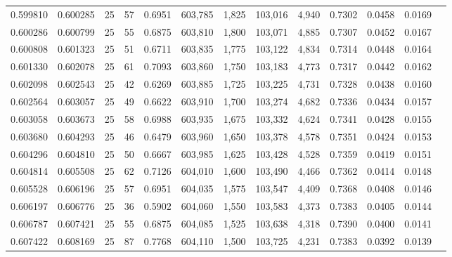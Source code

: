 \begin{tabular}{rrrrrrrrrrrrr}
0.599810 & 0.600285 &    25 &  57 &                                     0.6951 & 603,785 &   1,825 & 103,016 &   4,940 & 0.7302 & 0.0458 & 0.0169 \\
0.600286 & 0.600799 &    25 &  55 &                                     0.6875 & 603,810 &   1,800 & 103,071 &   4,885 & 0.7307 & 0.0452 & 0.0167 \\
0.600808 & 0.601323 &    25 &  51 &                                     0.6711 & 603,835 &   1,775 & 103,122 &   4,834 & 0.7314 & 0.0448 & 0.0164 \\
0.601330 & 0.602078 &    25 &  61 &                                     0.7093 & 603,860 &   1,750 & 103,183 &   4,773 & 0.7317 & 0.0442 & 0.0162 \\
0.602098 & 0.602543 &    25 &  42 &                                     0.6269 & 603,885 &   1,725 & 103,225 &   4,731 & 0.7328 & 0.0438 & 0.0160 \\
0.602564 & 0.603057 &    25 &  49 &                                     0.6622 & 603,910 &   1,700 & 103,274 &   4,682 & 0.7336 & 0.0434 & 0.0157 \\
0.603058 & 0.603673 &    25 &  58 &                                     0.6988 & 603,935 &   1,675 & 103,332 &   4,624 & 0.7341 & 0.0428 & 0.0155 \\
0.603680 & 0.604293 &    25 &  46 &                                     0.6479 & 603,960 &   1,650 & 103,378 &   4,578 & 0.7351 & 0.0424 & 0.0153 \\
0.604296 & 0.604810 &    25 &  50 &                                     0.6667 & 603,985 &   1,625 & 103,428 &   4,528 & 0.7359 & 0.0419 & 0.0151 \\
0.604814 & 0.605508 &    25 &  62 &                                     0.7126 & 604,010 &   1,600 & 103,490 &   4,466 & 0.7362 & 0.0414 & 0.0148 \\
0.605528 & 0.606196 &    25 &  57 &                                     0.6951 & 604,035 &   1,575 & 103,547 &   4,409 & 0.7368 & 0.0408 & 0.0146 \\
0.606197 & 0.606776 &    25 &  36 &                                     0.5902 & 604,060 &   1,550 & 103,583 &   4,373 & 0.7383 & 0.0405 & 0.0144 \\
0.606787 & 0.607421 &    25 &  55 &                                     0.6875 & 604,085 &   1,525 & 103,638 &   4,318 & 0.7390 & 0.0400 & 0.0141 \\
0.607422 & 0.608169 &    25 &  87 &                                     0.7768 & 604,110 &   1,500 & 103,725 &   4,231 & 0.7383 & 0.0392 & 0.0139 \\

\end{tabular}
